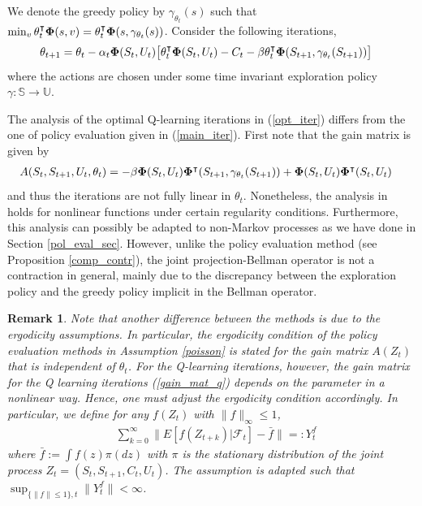 \documentclass[11pt]{article}
\newtheorem{remark}{Remark}
\begin{document}
We denote the greedy policy by $\gamma_{\theta_t}(s)$ such that $\min_v \theta_t^\intercal {\bf \Phi}(s,v) =  \theta_t^\intercal {\bf \Phi}(s,\gamma_{\theta_t}(s))  $.
Consider the following iterations,
\begin{align}\label{opt_iter}
\theta_{t+1}= \theta_t - \alpha_t {\bf \Phi}(S_t,U_t) &\big[\theta_t^\intercal {\bf \Phi}(S_t,U_t)-  C_t - \beta \theta_t^\intercal {\bf \Phi}(S_{t+1},\gamma_{\theta_t}(S_{t+1})) \big]
\end{align}
where the actions are chosen under some time invariant exploration policy $\gamma:\mathds{S} \to\mathds{U}$.

The analysis of the optimal Q-learning iterations in (\ref{opt_iter}) differs from the one of policy evaluation given in (\ref{main_iter}). First note that the gain matrix is given by
\begin{align}\label{gain_mat_q}
&A(S_t,S_{t+1},U_t,\theta_t)= -\beta{\bf \Phi}(S_t,U_t){\bf \Phi}^\intercal(S_{t+1},\gamma_{\theta_t}(S_{t+1}))+ {\bf \Phi}(S_t,U_t){\bf \Phi}^\intercal(S_{t},U_t)
\end{align}
and thus the iterations are not fully linear in $\theta_t$. Nonetheless, the analysis in \cite{benveniste2012adaptive} holds for nonlinear functions under certain regularity conditions. Furthermore, this analysis can possibly be adapted to non-Markov processes as we have done in Section \ref{pol_eval_sec}. However, unlike the policy evaluation method (see Proposition \ref{comp_contr}), the joint projection-Bellman operator is not a contraction in general, mainly due to the discrepancy between the exploration policy and the greedy policy implicit in the Bellman operator. 

\begin{remark}
Note that another difference between the methods is due to the ergodicity assumptions. In particular,  the ergodicity condition of the policy evaluation methods in Assumption \ref{poisson} is stated for the gain matrix $A(Z_t)$ that is independent of $\theta_t$. For the Q-learning iterations, however, the gain matrix for the Q learning iterations (\ref{gain_mat_q}) depends on the parameter in a nonlinear way. Hence, one must adjust the ergodicity condition accordingly. In particular, we define
for any $f(Z_t)$ with $\|f\|_\infty\leq 1$, 
\begin{align*}
&\sum_{k=0}^\infty \|E[f(Z_{t+k})|\mathcal{F}_t] -\bar{f} \| =:Y^f_t 
\end{align*}
where $\bar{f}:=\int f(z)\pi(dz)$ with $\pi$ is the stationary distribution of the joint process $Z_t=(S_t,S_{t+1},C_t,U_t)$. The assumption is adapted such that $\sup_{\{\|f\|\leq 1\},t}\|Y_t^f\| < \infty$.
\end{remark}
\end{document}

